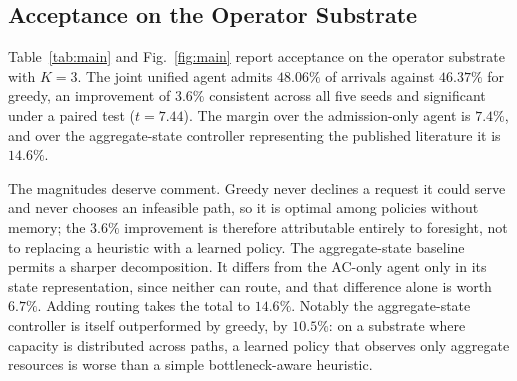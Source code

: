 \documentclass[10pt,journal,comsoc]{IEEEtran}
\begin{document}
\subsection{Acceptance on the Operator Substrate}
\label{sec:main}
Table~\ref{tab:main} and Fig.~\ref{fig:main} report acceptance on the
operator substrate with $K=3$. The joint unified agent admits $48.06\%$ of
arrivals against $46.37\%$ for greedy, an improvement of $3.6\%$
consistent across all five seeds and significant under a paired test
($t=7.44$). The margin over the admission-only agent is $7.4\%$, and over
the aggregate-state controller representing the published literature it is
$14.6\%$.

The magnitudes deserve comment. Greedy never declines a request it could
serve and never chooses an infeasible path, so it is optimal among
policies without memory; the $3.6\%$ improvement is therefore attributable
entirely to foresight, not to replacing a heuristic with a learned policy.
The aggregate-state baseline permits a sharper decomposition. It differs
from the AC-only agent only in its state representation, since neither can
route, and that difference alone is worth $6.7\%$. Adding routing takes the
total to $14.6\%$. Notably the aggregate-state controller is itself
outperformed by greedy, by $10.5\%$: on a substrate where capacity is
distributed across paths, a learned policy that observes only aggregate
resources is worse than a simple bottleneck-aware heuristic.
\end{document}
